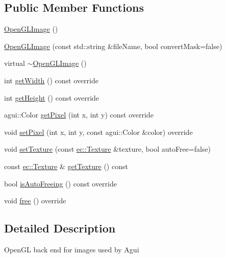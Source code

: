 \subsection*{Public Member Functions}
\begin{DoxyCompactItemize}
\item 
\mbox{\hyperlink{classec_1_1_open_g_l_image_a57aeab8be0ef8c1572b19b0eb4467bf0}{Open\+G\+L\+Image}} ()
\item 
\mbox{\hyperlink{classec_1_1_open_g_l_image_ac63966260eada2eb626534b04db40b4a}{Open\+G\+L\+Image}} (const std\+::string \&file\+Name, bool convert\+Mask=false)
\item 
virtual \mbox{\hyperlink{classec_1_1_open_g_l_image_ab8d25ab0565a0708cba90722122b7cd3}{$\sim$\+Open\+G\+L\+Image}} ()
\item 
int \mbox{\hyperlink{classec_1_1_open_g_l_image_ada8d04e018cf00e02f1ca0f2af00b0e0}{get\+Width}} () const override
\item 
int \mbox{\hyperlink{classec_1_1_open_g_l_image_a49fdec86e0dbd02fb682e212905eafd9}{get\+Height}} () const override
\item 
agui\+::\+Color \mbox{\hyperlink{classec_1_1_open_g_l_image_aa9212bc11a88995ba31f3e83cfe843f6}{get\+Pixel}} (int x, int y) const override
\item 
void \mbox{\hyperlink{classec_1_1_open_g_l_image_a0f10c45c14e5092b1b7b5a57d09f2682}{set\+Pixel}} (int x, int y, const agui\+::\+Color \&color) override
\item 
void \mbox{\hyperlink{classec_1_1_open_g_l_image_ac2ac8ff7716843a697e269e172788961}{set\+Texture}} (const \mbox{\hyperlink{classec_1_1_texture}{ec\+::\+Texture}} \&texture, bool auto\+Free=false)
\item 
const \mbox{\hyperlink{classec_1_1_texture}{ec\+::\+Texture}} \& \mbox{\hyperlink{classec_1_1_open_g_l_image_a227cab9aa935512020183717b76356c2}{get\+Texture}} () const
\item 
bool \mbox{\hyperlink{classec_1_1_open_g_l_image_a5d441f3a70726dcf21ab70e2edbbdf9d}{is\+Auto\+Freeing}} () const override
\item 
void \mbox{\hyperlink{classec_1_1_open_g_l_image_acd8aed2a9b14c2bb4f47e2d204895f7e}{free}} () override
\end{DoxyCompactItemize}


\subsection{Detailed Description}
Open\+GL back end for images used by Agui 

